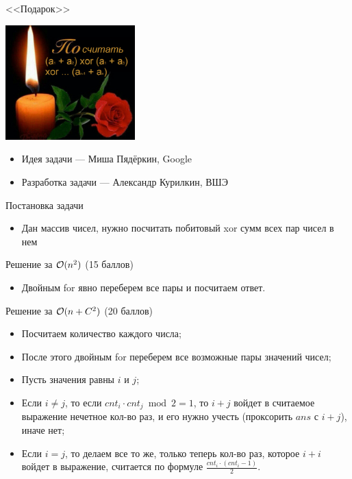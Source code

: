 \begin{frame}
  \begin{center}
    \LARGE <<Подарок>>
  \end{center}

  \begin{center}
      \includegraphics[width=5cm]{memes/e-meme.png}
  \end{center}

  \begin{itemize}
  \item Идея задачи --- Миша Пядёркин, Google
  \item Разработка задачи --- Александр Курилкин, ВШЭ
  \end{itemize}

\end{frame}

\begin{frame}{Постановка задачи}

  \begin{itemize}
  \item Дан массив чисел, нужно посчитать побитовый xor сумм всех пар чисел в нем
  \end{itemize}

\end{frame}

\begin{frame}{Решение за $\mathcal{O}(n^2)$ (15 баллов)}
  \begin{itemize}
  \item Двойным for явно переберем все пары и посчитаем ответ.
  \end{itemize}
\end{frame}

\begin{frame}{Решение за $\mathcal{O}(n + C^2)$ (20 баллов)}
  \begin{itemize}
  \item Посчитаем количество каждого числа;
  \item После этого двойным for переберем все возможные пары значений чисел;
  \item Пусть значения равны $i$ и $j$;
  \item Если $i \neq j$, то если $cnt_i \cdot cnt_j \bmod 2 = 1$, то $i + j$ войдет в считаемое выражение нечетное кол-во раз, и его нужно учесть (проксорить $ans$ с $i + j$), иначе нет;
  \item Если $i = j$, то делаем все то же, только теперь кол-во раз, которое $i + i$ войдет в выражение, считается по формуле $\frac{cnt_i \cdot (cnt_{i} - 1)}{2}$.
  \end{itemize}
\end{frame}

